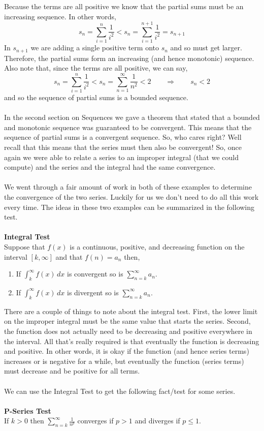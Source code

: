 \documentclass[10pt,reqno]{book}
\theoremstyle{definition}
\begin{document}
	Because the terms are all positive we know that the partial sums must be an increasing sequence. In other words,
	\[ s_n = \sum\limits_{i=1}^{n} \frac{1}{i^2} < s_n = \sum\limits_{i=1}^{n+1} \frac{1}{i^2} = s_{n+1} \]
	In $ s_{n+1} $ we are adding a single positive term onto $ s_n $ and so must get larger. Therefore, the partial sums form an increasing (and hence monotonic) sequence. Also note that, since the terms are all positive, we can say,
	\[ s_n = \sum\limits_{i=1}^{n} \frac{1}{i^2} < s_n = \sum\limits_{n=1}^{\infty} \frac{1}{n^2} < 2 \qquad \Rightarrow \qquad s_n < 2 \]
	and so the sequence of partial sums is a bounded sequence.\\ \\
	In the second section on Sequences we gave a theorem that stated that a bounded and monotonic sequence was guaranteed to be convergent. This means that the sequence of partial sums is a convergent sequence. So, who cares right? Well recall that this means that the series must then also be convergent! So, once again we were able to relate a series to an improper integral (that we could compute) and the series and the integral had the same convergence.\\ \\
	We went through a fair amount of work in both of these examples to determine the convergence of the two series.  Luckily for us we don’t need to do all this work every time.  The ideas in these two examples can be summarized in the following test.\\ \\
	\textbf{Integral Test}\\
	Suppose that $ f(x) $ is a continuous, positive, and decreasing function on the interval $ [k,\infty] $ and that $ f(n) = a_n $ then,
	\begin{enumerate}
		\item If $ \int_{k}^{\infty} f(x)\,dx $ is convergent so is $ \sum\limits_{n=k}^{\infty} a_n $.
		
		\item If $ \int_{k}^{\infty} f(x)\,dx $ is divergent so is $ \sum\limits_{n=k}^{\infty} a_n $.
	\end{enumerate}
	There are a couple of things to note about the integral test. First, the lower limit on the improper integral must be the same value that starts the series.  Second, the function does not actually need to be decreasing and positive everywhere in the interval. All that's really required is that eventually the function is decreasing and positive. In other words, it is okay if the function (and hence series terms) increases or is negative for a while, but eventually the function (series terms) must decrease and be positive for all terms. \\ \\
	We can use the Integral Test to get the following fact/test for some series.\\ \\
	\textbf{P-Series Test}\\
	If $ k > 0 $ then $ \sum\limits_{n=k}^{\infty} \frac{1}{n^p} $ converges if $ p > 1 $ and diverges if $ p \leq 1 $.
	
\end{document}
